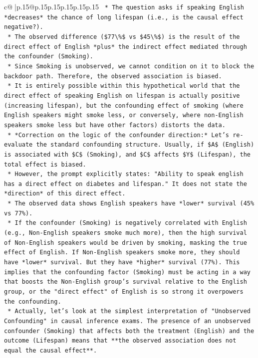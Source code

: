 \documentclass{article}
\begin{document}
{\begin{supertabular}{c@{$\;$}|p{.15\linewidth}@{}p{.15\linewidth}p{.15\linewidth}p{.15\linewidth}p{.15\linewidth}p{.15\linewidth}}
{{{\texttt{    *   The question asks if speaking English *decreases* the chance of long lifespan (i.e., is the causal effect negative?).} \\
\texttt{    *   The observed difference (\$77\textbackslash{}\%\$ vs \$45\textbackslash{}\%\$) is the result of the direct effect of English *plus* the indirect effect mediated through the confounder (Smoking).} \\
\texttt{    *   Since Smoking is unobserved, we cannot condition on it to block the backdoor path. Therefore, the observed association is biased.} \\
\texttt{    *   It is entirely possible within this hypothetical world that the direct effect of speaking English on lifespan is actually positive (increasing lifespan), but the confounding effect of smoking (where English speakers might smoke less, or conversely, where non{-}English speakers smoke less but have other factors) distorts the data.} \\
\texttt{    *   *Correction on the logic of the confounder direction:* Let's re{-}evaluate the standard confounding structure. Usually, if \$A\$ (English) is associated with \$C\$ (Smoking), and \$C\$ affects \$Y\$ (Lifespan), the total effect is biased.} \\
\texttt{    *   However, the prompt explicitly states: "Ability to speak english has a direct effect on diabetes and lifespan." It does not state the *direction* of this direct effect.} \\
\texttt{    *   The observed data shows English speakers have *lower* survival (45\% vs 77\%).} \\
\texttt{    *   If the confounder (Smoking) is negatively correlated with English (e.g., Non{-}English speakers smoke much more), then the high survival of Non{-}English speakers would be driven by smoking, masking the true effect of English. If Non{-}English speakers smoke more, they should have *lower* survival. But they have *higher* survival (77\%). This implies that the confounding factor (Smoking) must be acting in a way that boosts the Non{-}English group's survival relative to the English group, or the "direct effect" of English is so strong it overpowers the confounding.} \\
\texttt{    *   Actually, let's look at the simplest interpretation of "Unobserved Confounding" in causal inference exams. The presence of an unobserved confounder (Smoking) that affects both the treatment (English) and the outcome (Lifespan) means that **the observed association does not equal the causal effect**.} \\
}}}
\end{supertabular}}
\end{document}
